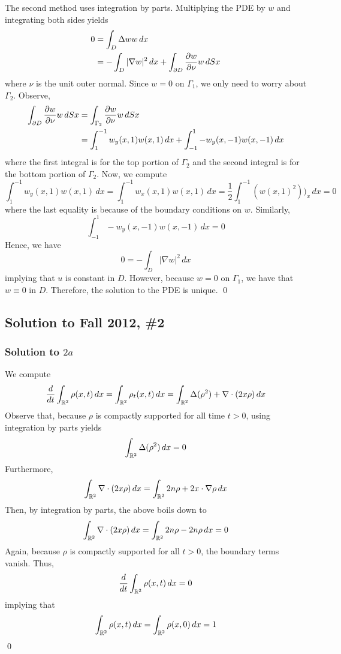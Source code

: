 \vspace{0.4cm}

The second method uses integration by parts. Multiplying the PDE by $w$ and integrating both sides yields
\begin{align*}
0 &= \int_D \Delta w w \, dx \\
&= - \int_D |\nabla w|^2 \, dx + \int_{\partial D} \frac{\partial w}{\partial \nu} w \, dSx	
\end{align*}
where $\nu$ is the unit outer normal. Since $w = 0$ on $\Gamma_1$, we only need to worry about $\Gamma_2$. Observe,
\begin{align*}
\int_{\partial D} \frac{\partial w}{\partial \nu} w \, dSx &= \int_{\Gamma_2} \frac{\partial w}{\partial \nu} w \, dSx \\
&= \int_{1}^{-1} w_y(x,1) w(x,1) \, dx + \int_{-1}^1 -w_y(x,-1) w(x,-1) \, dx
\end{align*}
where the first integral is for the top portion of $\Gamma_2$ and the second integral is for the bottom portion of $\Gamma_2$. Now, we compute
$$ \int_1^{-1} w_y(x,1) w(x,1) \, dx = \int_1^{-1} w_x(x,1) w(x,1) \, dx = \frac{1}{2} \int_1^{-1} (w(x,1)^2))_x \, dx = 0$$
where the last equality is because of the boundary conditions on $w$. Similarly,
$$ \int_{-1}^1 -w_y(x,-1)w(x,-1) \, dx = 0 $$
Hence, we have
$$ 0 = -\int_D |\nabla w|^2 \, dx $$
implying that $u$ is constant in $D$. However, because $w = 0$ on $\Gamma_1$, we have that $w \equiv 0$ in $D$. Therefore, the solution to the PDE is unique. \qed




\subsection*{Solution to Fall 2012, \#2}
\label{F12Q4}

\subsubsection*{Solution to $2a$}

We compute
$$ \frac{d}{dt} \int_{\mathbb{R}^2} \rho(x,t)\, dx = \int_{\mathbb{R}^2} \rho_t(x,t) \, dx = \int_{\mathbb{R}^2} \Delta (\rho^2) + \nabla \cdot (2x \rho) \, dx $$
Observe that, because $\rho$ is compactly supported for all time $t>0$, using integration by parts yields
$$ \int_{\mathbb{R}^2} \Delta (\rho^2) \, dx = 0 $$
Furthermore,
$$ \int_{\mathbb{R}^2} \nabla \cdot (2x \rho) \, dx  = \int_{\mathbb{R}^2} 2n\rho + 2x \cdot \nabla \rho \, dx $$
Then, by integration by parts, the above boils down to
$$ \int_{\mathbb{R}^2} \nabla \cdot (2x \rho) \, dx = \int_{\mathbb{R}^2} 2n \rho - 2n \rho \, dx = 0$$
Again, because $\rho$ is compactly supported for all $t>0$, the boundary terms vanish. Thus,
$$ \frac{d}{dt} \int_{\mathbb{R}^2} \rho(x,t) \, dx = 0 $$
implying that
$$ \int_{\mathbb{R}^2} \rho(x,t) \, dx = \int_{\mathbb{R}^2} \rho(x,0) \, dx = 1 $$
\hfill \qed


